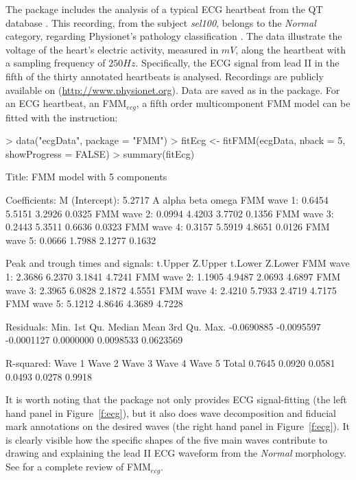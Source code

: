 The  package includes the analysis of a typical ECG heartbeat from the QT database \citep{Laguna+Mark+Goldberg+Moody:1997}. This recording, from the subject \textit{sel100}, belongs to the \textit{Normal} category, regarding Physionet's  pathology classification \citep{Goldberger+Amaral+Glass+Hausdorff+etal:2000}. The data illustrate the voltage of the heart's electric activity, measured in $mV$, along the heartbeat with a sampling frequency of $250Hz$. Specifically, the ECG signal from lead II in the fifth of the thirty annotated heartbeats is analysed. Recordings are publicly available on (\url{http://www.physionet.org}). Data are saved as  in the package. For an ECG heartbeat, an FMM$_{ecg}$, a fifth order multicomponent FMM model can be fitted with the instruction: 
%
\begin{example}
> data("ecgData", package = "FMM")
> fitEcg <- fitFMM(ecgData, nback = 5, showProgress = FALSE)
> summary(fitEcg)

Title:
FMM model with 5 components

Coefficients:
M (Intercept): 5.2717
                  A  alpha   beta  omega
FMM wave 1:  0.6454 5.5151 3.2926 0.0325
FMM wave 2:  0.0994 4.4203 3.7702 0.1356
FMM wave 3:  0.2443 5.3511 0.6636 0.0323
FMM wave 4:  0.3157 5.5919 4.8651 0.0126
FMM wave 5:  0.0666 1.7988 2.1277 0.1632

Peak and trough times and signals:
             t.Upper Z.Upper t.Lower Z.Lower
FMM wave 1:   2.3686  6.2370  3.1841  4.7241
FMM wave 2:   1.1905  4.9487  2.0693  4.6897
FMM wave 3:   2.3965  6.0828  2.1872  4.5551
FMM wave 4:   2.4210  5.7933  2.4719  4.7175
FMM wave 5:   5.1212  4.8646  4.3689  4.7228

Residuals:
      Min.    1st Qu.     Median       Mean    3rd Qu.       Max. 
-0.0690885 -0.0095597 -0.0001127  0.0000000  0.0098533  0.0623569 

R-squared:
Wave 1 Wave 2 Wave 3 Wave 4 Wave 5  Total 
0.7645 0.0920 0.0581 0.0493 0.0278 0.9918 
\end{example}
%

It is worth noting that the  package not only provides ECG signal-fitting (the left hand panel in Figure~\ref{f:ecg}), but it also does wave decomposition and fiducial mark annotations on the desired waves (the right hand panel in Figure~\ref{f:ecg}). It is clearly visible how the specific shapes of the five main waves contribute to drawing and explaining the lead II ECG waveform from the \textit{Normal} morphology. See \cite{Rueda+Larriba+Lamela:2021} for a complete review of FMM$_{ecg}$.

